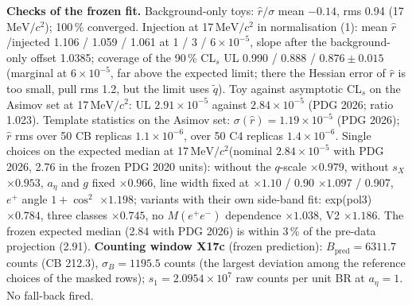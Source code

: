 \documentclass[11pt,a4paper]{article}
\newcommand{\Mee}{\ensuremath{M(e^{+}e^{-})}\xspace}
\newcommand{\nbinv}{\ensuremath{\mathrm{nb}^{-1}}\xspace}
\newcommand{\MeVcc}{\ensuremath{\mathrm{MeV}/c^{2}}\xspace}
\newcommand{\code}[1]{\texttt{\detokenize{#1}}}
\newcommand{\aEta}{\ensuremath{a_\eta}\xspace}
\newcommand{\tabin}[1]{}
\begin{document}
\begin{table}[H]
\centering
\caption{Expected 90\,\% CL$_s$ upper limits ($\times10^{5}$), frozen before unblinding. Background-only Asimov set of the data side-band fit (no data
of \Mee 12--28\,\MeVcc used) and background-only toys; S0, isBest $\ge0$, X2D, $L=6079.2\,\nbinv$, 2D likelihood, $\tilde q_r$. Frozen choice: toy
median and bands at the quoted masses, the Asimov curve against $m_X$. Converted to PDG 2026 (D25): the Asimov set rerun with
BR$_{\mathrm{dir}}=2.76\times10^{-4}$ and its PDG 2026 uncertainty, the toys $\times2.76/2.68\times k$ ($k=1.0011$--1.0013), (2) $\times1.00436$,
(3) $\times1.0224$. Source: x17c (\code{x17c_expected.tex}, PDG 2020, frozen), converted in \code{x17c_expected_pdg26.tex}. No fall-back involved.}
\label{tab:x17exp}
\small
\resizebox{\textwidth}{!}{\tabin{x17c_expected_pdg26.tex}}
\end{table}

\textbf{Checks of the frozen fit.} Background-only toys: $\hat r/\sigma$ mean $-0.14$, rms 0.94 (17\,\MeVcc); 100\,\% converged. Injection at 17\,\MeVcc in
normalisation (1): mean $\hat r$/injected 1.106 / 1.059 / 1.061 at 1 / 3 / $6\times10^{-5}$, slope after the background-only offset 1.0385; coverage of the
90\,\% CL$_s$ UL 0.990 / 0.888 / $0.876\pm0.015$ (marginal at $6\times10^{-5}$, far above the expected limit; there the Hessian error of $\hat r$ is too small,
pull rms 1.2, but the limit uses $\tilde q$). Toy against asymptotic CL$_s$ on the Asimov set at 17\,\MeVcc: UL $2.91\times10^{-5}$ against $2.84\times10^{-5}$
(PDG 2026; ratio 1.023). Template statistics on the Asimov set: $\sigma(\hat r)=1.19\times10^{-5}$ (PDG 2026); $\hat r$ rms over 50 CB replicas $1.1\times10^{-6}$, over 50 C4
replicas $1.4\times10^{-6}$. Single choices on the expected median at 17\,\MeVcc (nominal $2.84\times10^{-5}$ with PDG 2026, 2.76 in the frozen PDG 2020 units): without the $q$-scale $\times0.979$, without
$s_X$ $\times0.953$, \aEta and $g$ fixed $\times0.966$, line width fixed at $\times1.10$ / 0.90 $\times1.097$ / 0.907, $e^+$ angle $1+\cos^2$ $\times1.198$;
variants with their own side-band fit: exp(pol3) $\times0.784$, three classes $\times0.745$, no \Mee dependence $\times1.038$, V2 $\times1.186$. The
frozen expected median (2.84 with PDG 2026) is within 3\,\% of the pre-data projection (2.91). \textbf{Counting window X17c} (frozen prediction): $B_{\mathrm{pred}}=6311.7$
counts (CB 212.3), $\sigma_B=1195.5$ counts (the largest deviation among the reference choices of the masked rows); $s_1=2.0954\times10^7$ raw counts per unit
BR at $\aEta=1$. No fall-back fired.
\end{document}
